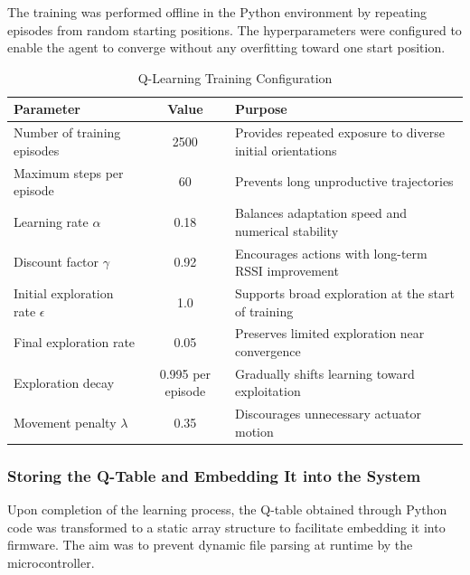 The training was performed offline in the Python environment by repeating episodes from random starting positions. The hyperparameters were configured to enable the agent to converge without any overfitting toward one start position.

\begin{table}[H]
\centering
\caption{Q-Learning Training Configuration}
\label{tab:q_learning_parameters}
\renewcommand{\arraystretch}{1.4}
\begin{tabular}{|p{4.8cm}|c|p{5.0cm}|}
\hline
\textbf{Parameter} & \textbf{Value} & \textbf{Purpose} \\
\hline
Number of training episodes & 2500 & Provides repeated exposure to diverse initial orientations \\
\hline
Maximum steps per episode & 60 & Prevents long unproductive trajectories \\
\hline
Learning rate $\alpha$ & 0.18 & Balances adaptation speed and numerical stability \\
\hline
Discount factor $\gamma$ & 0.92 & Encourages actions with long-term RSSI improvement \\
\hline
Initial exploration rate $\epsilon$ & 1.0 & Supports broad exploration at the start of training \\
\hline
Final exploration rate & 0.05 & Preserves limited exploration near convergence \\
\hline
Exploration decay & 0.995 per episode & Gradually shifts learning toward exploitation \\
\hline
Movement penalty $\lambda$ & 0.35 & Discourages unnecessary actuator motion \\
\hline
\end{tabular}
\end{table}

\subsubsection{Storing the Q-Table and Embedding It into the System}

Upon completion of the learning process, the Q-table obtained through Python code was transformed to a static array structure to facilitate embedding it into firmware. The aim was to prevent dynamic file parsing at runtime by the microcontroller.

